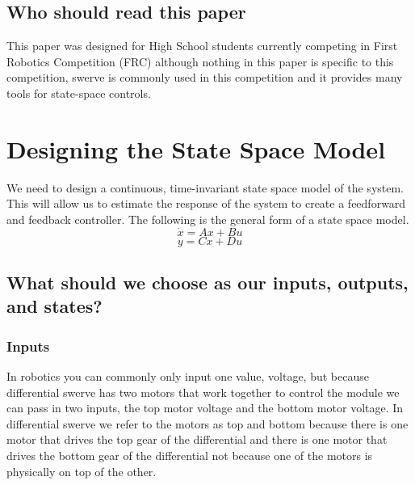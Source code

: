 \documentclass{scrartcl}
\begin{document}
\subsection{Who should read this paper}
This paper was designed for High School students currently competing in First Robotics Competition (FRC) although nothing in this paper is specific to this competition, swerve is commonly used in this competition and it provides many tools for state-space controls.

\newpage
\section{Designing the State Space Model}

We need to design a continuous, time-invariant state space model of the system. This will allow us to estimate the response of the system to create a feedforward and feedback controller. The following is the general form of a state space model.
\begin{equation} \label{state-change}
    \dot{x} = Ax + Bu
\end{equation}
\begin{equation} \label{output}
    y = Cx + Du
\end{equation}

\subsection*{What should we choose as our inputs, outputs, and states?}
\subsubsection*{Inputs}
In robotics you can commonly only input one value, voltage, but because differential swerve has two motors that work together to control the module we can pass in two inputs, the top motor voltage and the bottom motor voltage. In differential swerve we refer to the motors as top and bottom because there is one motor that drives the top gear of the differential and there is one motor that drives the bottom gear of the differential not because one of the motors is physically on top of the other.
\end{document}
